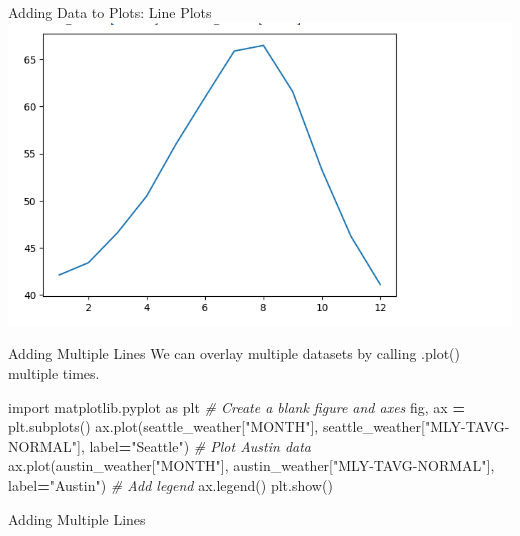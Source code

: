 \documentclass[
  ignorenonframetext,
]{beamer}
\newenvironment{Shaded}{\begin{snugshade}}{\end{snugshade}}
\newcommand{\CommentTok}[1]{\textcolor[rgb]{0.56,0.35,0.01}{\textit{#1}}}
\newcommand{\ImportTok}[1]{#1}
\newcommand{\NormalTok}[1]{#1}
\newcommand{\OperatorTok}[1]{\textcolor[rgb]{0.81,0.36,0.00}{\textbf{#1}}}
\newcommand{\StringTok}[1]{\textcolor[rgb]{0.31,0.60,0.02}{#1}}
\begin{document}
\begin{frame}{Adding Data to Plots: Line Plots}
\label{adding-data-to-plots-line-plots}
\includegraphics{../images/im226.png}
\end{frame}

\begin{frame}[fragile]{Adding Multiple Lines}
\label{adding-multiple-lines}
We can overlay multiple datasets by calling .plot() multiple times.


\begin{Shaded}
\begin{Highlighting}[]
\ImportTok{import}\NormalTok{ matplotlib.pyplot }\ImportTok{as}\NormalTok{ plt}
\CommentTok{\# Create a blank figure and axes}
\NormalTok{fig, ax }\OperatorTok{=}\NormalTok{ plt.subplots()}
\NormalTok{ax.plot(seattle\_weather[}\StringTok{"MONTH"}\NormalTok{], seattle\_weather[}\StringTok{"MLY{-}TAVG{-}NORMAL"}\NormalTok{], label}\OperatorTok{=}\StringTok{"Seattle"}\NormalTok{)}
\CommentTok{\# Plot Austin data}
\NormalTok{ax.plot(austin\_weather[}\StringTok{"MONTH"}\NormalTok{], austin\_weather[}\StringTok{"MLY{-}TAVG{-}NORMAL"}\NormalTok{], label}\OperatorTok{=}\StringTok{"Austin"}\NormalTok{)}
\CommentTok{\# Add legend}
\NormalTok{ax.legend()}
\NormalTok{plt.show()}
\end{Highlighting}
\end{Shaded}
\end{frame}

\begin{frame}{Adding Multiple Lines}
\label{adding-multiple-lines-1}
\end{frame}
\end{document}
